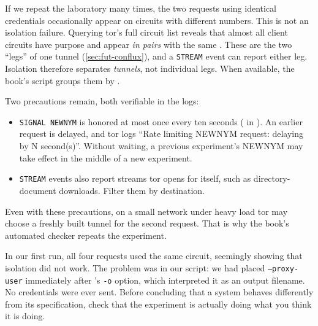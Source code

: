 \begin{approfondimento}
If we repeat the laboratory many times, the two requests using identical credentials occasionally appear on circuits with different numbers. This is not an isolation failure. Querying tor's full circuit list reveals that almost all client circuits have purpose  and appear \emph{in pairs} with the same . These are the two \enquote{legs} of one tunnel (\cref{sec:fut-conflux}), and a \texttt{STREAM} event can report either leg. Isolation therefore separates \emph{tunnels}, not individual legs. When available, the book's script groups them by .

Two precautions remain, both verifiable in the logs:
\begin{itemize}
  \item \texttt{SIGNAL NEWNYM} is honored at most once every ten seconds ( in ). An earlier request is delayed, and tor logs \enquote{Rate limiting NEWNYM request: delaying by N second(s)}. Without waiting, a previous experiment's NEWNYM may take effect in the middle of a new experiment.
  \item \texttt{STREAM} events also report streams tor opens for itself, such as directory-document downloads. Filter them by destination.
\end{itemize}
Even with these precautions, on a small network under heavy load tor may choose a freshly built tunnel for the second request. That is why the book's automated checker repeats the experiment.
\end{approfondimento}

\begin{attenzione}
In our first run, all four requests used the same circuit, seemingly showing that isolation did not work. The problem was in our script: we had placed \texttt{--proxy-user} immediately after 's \texttt{-o} option, which interpreted it as an output filename. No credentials were ever sent. Before concluding that a system behaves differently from its specification, check that the experiment is actually doing what you think it is doing.
\end{attenzione}

